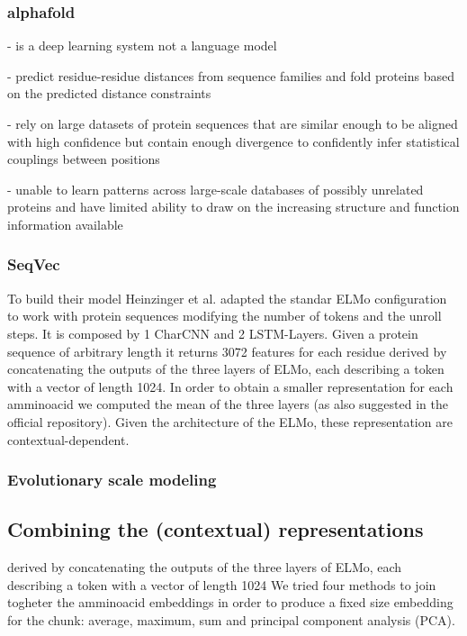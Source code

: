 \documentclass[12pt, letterpaper, twocolumn]{article}
\begin{document}
\subsubsection{alphafold}

- is a deep learning system not a language model

- predict residue-residue distances from sequence families and fold proteins based on the predicted distance constraints

- rely on large datasets of protein sequences that are similar enough to be aligned with high confidence but contain enough divergence to confidently infer statistical couplings between positions

- unable to learn patterns across large-scale databases of possibly unrelated proteins and have limited ability to draw on the increasing structure and function information available


\subsubsection{SeqVec}
To build their model Heinzinger et al.\cite{heinzinger2019modeling} adapted the standar ELMo configuration \cite{peters-etal-2018-deep} to work with protein sequences modifying the number of tokens and the unroll steps. It is composed by 1 CharCNN and 2 LSTM-Layers. Given a protein sequence of arbitrary length it returns 3072 features for each residue derived by concatenating the outputs of the three layers of ELMo, each describing a token with a vector of length 1024. In order to obtain a smaller representation for each amminoacid we computed the mean of the three layers (as also suggested in the official repository). Given the architecture of the ELMo, these representation are contextual-dependent.


\subsubsection{Evolutionary scale modeling}


\subsection{Combining the (contextual) representations}derived by concatenating the outputs of the three layers of ELMo, each describing a token with a vector of length 1024
We tried four methods to join togheter the amminoacid embeddings in order to produce a fixed size embedding for the chunk: average, maximum, sum and principal component analysis (PCA). 
\end{document}
